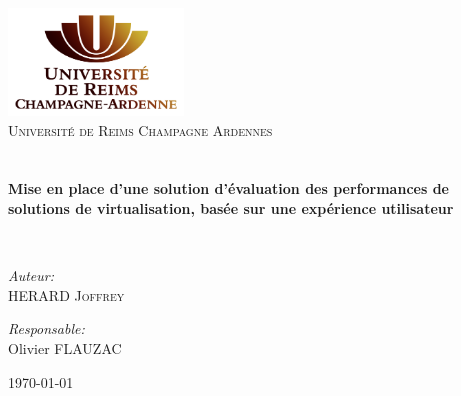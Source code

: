 \begin{titlepage}
\begin{center}

\includegraphics[width=0.35\textwidth]{./logo}~\\[1cm]

\textsc{\LARGE Université de Reims Champagne Ardennes}\\[1.5cm]

\textsc{\Large }\\[0.5cm]

\HRule \\[0.4cm]

{\huge \bfseries  
Mise en place d'une solution d’évaluation des performances de solutions de virtualisation, basée sur une expérience utilisateur\\[0.4cm] }

\HRule \\[1.5cm]

\begin{minipage}{0.4\textwidth}
\begin{flushleft} \large
\emph{Auteur:}\\
HERARD \textsc{Joffrey}\\
\end{flushleft}
\end{minipage}
\begin{minipage}{0.4\textwidth}
\begin{flushright} \large
\emph{Responsable:} \\
Olivier \textsc{FLAUZAC}\\
\end{flushright}
\end{minipage}

\vfill

{\large \today}

\end{center}
\end{titlepage}
